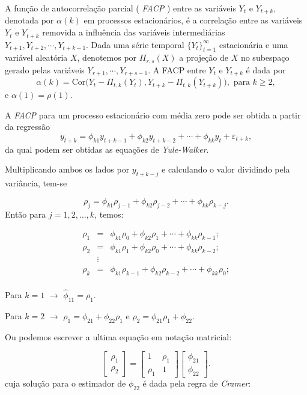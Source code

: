 \documentclass[
]{book}
\theoremstyle{definition}
\theoremstyle{definition}
\theoremstyle{definition}
\theoremstyle{remark}
\begin{document}
A função de autocorrelação parcial ( \emph{FACP} ) entre as variáveis \(Y_t\) e \(Y_{t+k}\), denotada por \(\alpha(k)\) em processos estacionários, é a correlação entre as variáveis \(Y_t\) e \(Y_{t+k}\) removida a influência das variáveis intermediárias \(Y_{t+1},Y_{t+2},\cdots, Y_{t+k-1}\). Dada uma série temporal \(\{Y_t\}_{t=1}^\infty\) estacionária e uma variável aleatória \(X\), denotemos por \(\Pi_{r,s}(X)\) a projeção de \(X\) no subespaço gerado pelas variáveis \(Y_{r+1},\cdots,Y_{r+s-1}\). A FACP entre \(Y_t\) e \(Y_{t+k}\) é dada por
\[\alpha(k)=\mbox{Cor}\big(Y_t-\Pi_{t,k}(Y_t),Y_{t+k}-\Pi_{t,k}(Y_{t+k})\big), \mbox{ para }k\geq 2,\]
e \(\alpha(1)=\rho(1)\).

A \emph{FACP} para um processo estacionário com média zero pode ser obtida a partir da regressão
\begin{equation}
y_{t+k} = \phi_{k1} y_{t+k-1} + \phi_{k2} y_{t+k-2} +\cdots + \phi_{kk} y_{t}+\varepsilon_{t+k},
\end{equation}
da qual podem ser obtidas as equações de \emph{Yule-Walker}.

Multiplicando ambos os lados por \(y_{t+k-j}\) e calculando o valor dividindo pela variância, tem-se

\begin{equation*}
\rho_j = \phi_{k1}\rho_{j-1} + \phi_{k2}\rho_{j-2} +\cdots + \phi_{kk} \rho_{k-j}.
\end{equation*}
Então para \(j = 1, 2, \ldots, k\), temos:

\begin{eqnarray*}
\rho_1 &=& \phi_{k1}\rho_{0} + \phi_{k2}\rho_{1} +\cdots + \phi_{kk} \rho_{k-1};\\
\rho_2 &=& \phi_{k1}\rho_{1} + \phi_{k2}\rho_{0} +\cdots + \phi_{kk} \rho_{k-2};\\
&\vdots&\\
\rho_k &=& \phi_{k1}\rho_{k-1} + \phi_{k2}\rho_{k-2} +\cdots + \phi_{kk} \rho_{0};\\
\end{eqnarray*}

Para \(k = 1\) \(\rightarrow\) \(\hat{\phi}_{11} = \rho_1\).

Para \(k = 2\) \(\rightarrow\) \(\rho_1 = \phi_{21} + \phi_{22}\rho_1\) e \(\rho_2 = \phi_{21}\rho_1 + \phi_{22}\).

Ou podemos escrever a ultima equação em notação matricial:

\begin{equation*}
 \begin{bmatrix}
\rho_1 \\
\rho_2
\end{bmatrix}
=
 \begin{bmatrix}
1&\rho_1 \\
\rho_1&1
\end{bmatrix}
 \begin{bmatrix}
\phi_{21}\\
\phi_{22}
\end{bmatrix}.
\end{equation*}
cuja solução para o estimador de \(\phi_{22}\) é dada pela regra de \emph{Cramer}:
\end{document}
